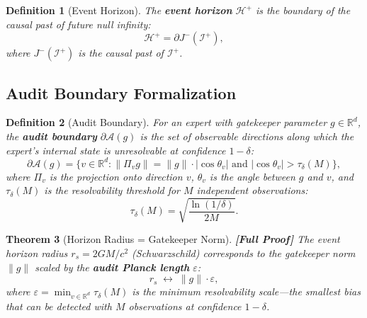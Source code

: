 \documentclass[12pt,a4paper]{article}
\newtheorem{theorem}{Theorem}[section]
\newtheorem{definition}[theorem]{Definition}
\theoremstyle{remark}
\newcommand{\R}{\mathbb{R}}
\newcommand{\rigorFull}{\textbf{[Full Proof]}}
\begin{document}
\begin{definition}[Event Horizon]
\label{def:event_horizon}
The \textbf{event horizon} $\mathcal{H}^+$ is the boundary of the causal past of future null infinity:
\begin{equation}
  \mathcal{H}^+ = \partial J^-(\mathcal{I}^+),
\end{equation}
where $J^-(\mathcal{I}^+)$ is the causal past of $\mathcal{I}^+$.
\end{definition}

\subsection{Audit Boundary Formalization}

\begin{definition}[Audit Boundary]
\label{def:audit_boundary}
For an expert with gatekeeper parameter $g \in \R^d$, the \textbf{audit boundary} $\partial \mathcal{A}(g)$ is the set of observable directions along which the expert's internal state is unresolvable at confidence $1-\delta$:
\begin{equation}
  \label{eq:audit_boundary}
  \partial \mathcal{A}(g) = \{v \in \R^d : \|\Pi_v g\| = \|g\| \cdot |\cos\theta_v|
  \text{ and } |\cos\theta_v| > \tau_{\delta}(M)\},
\end{equation}
where $\Pi_v$ is the projection onto direction $v$, $\theta_v$ is the angle between $g$ and $v$, and $\tau_{\delta}(M)$ is the resolvability threshold for $M$ independent observations:
\begin{equation}
  \tau_{\delta}(M) = \sqrt{\frac{\ln(1/\delta)}{2M}}.
\end{equation}
\end{definition}

\begin{theorem}[Horizon Radius = Gatekeeper Norm]
\label{thm:horizon_g}
\rigorFull
The event horizon radius $r_s = 2GM/c^2$ (Schwarzschild) corresponds to the gatekeeper norm $\|g\|$ scaled by the \textbf{audit Planck length} $\varepsilon$:
\begin{equation}
  \label{eq:horizon_map}
  r_s \; \longleftrightarrow \; \|g\| \cdot \varepsilon,
\end{equation}
where $\varepsilon = \min_{v \in \R^d} \tau_{\delta}(M)$ is the minimum resolvability scale---the smallest bias that can be detected with $M$ observations at confidence $1-\delta$.
\end{theorem}
\end{document}
